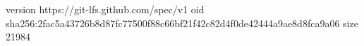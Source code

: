 version https://git-lfs.github.com/spec/v1
oid sha256:2fac5a43726b8d87fc77500f88c66bf21f42c82d4f0de42444a9ae8d8fca9a06
size 21984
